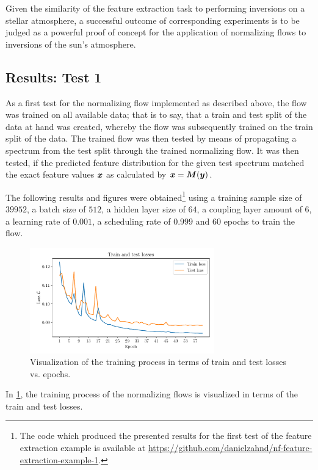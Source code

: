 \documentclass[a4paper,12pt]{report}
\begin{document}
Given the similarity of the feature extraction task to performing inversions on a stellar atmosphere, a successful outcome of corresponding experiments is to be judged as a powerful proof of concept for the application of normalizing flows to inversions of the sun's atmosphere.

\subsection{Results: Test 1}\label{sec:feature-extraction-test-1}
As a first test for the normalizing flow implemented as described above, the flow was trained on all available data; that is to say, that a train and test split of the data at hand was created, whereby the flow was subsequently trained on the train split of the data. The trained flow was then tested by means of propagating a spectrum from the test split through the trained normalizing flow. It was then tested, if the predicted feature distribution for the given test spectrum matched the exact feature values $\bm{x}$ as calculated by $\bm{x} = \bm{M}(\bm{y})$.

The following results and figures were obtained\footnote{The code which produced the presented results for the first test of the feature extraction example is available at \url{https://github.com/danielzahnd/nf-feature-extraction-example-1}.} using a training sample size of $39952$, a batch size of $512$, a hidden layer size of $64$, a coupling layer amount of $6$, a learning rate of $0.001$, a scheduling rate of $0.999$ and $60$ epochs to train the flow.

\begin{figure}[h!]
\centering
\includegraphics[width=8cm]{figures/nf-feature-extraction-example-1-loss.pdf}
\caption{Visualization of the training process in terms of train and test losses vs. epochs.}
\label{fig:nf-feature-extraction-example-1-loss}
\end{figure}
In \cref{fig:nf-feature-extraction-example-1-loss}, the training process of the normalizing flows is visualized in terms of the train and test losses.
\end{document}
